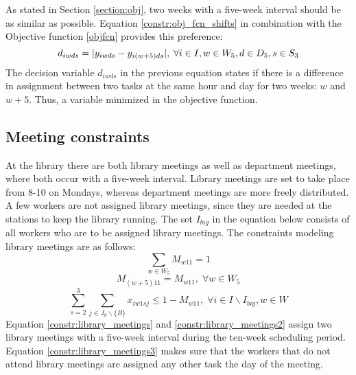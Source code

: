 As stated in Section \ref{section:obj}, two weeks with a five-week interval should be as similar as possible. Equation \ref{constr:obj_fcn_shifts} in combination with the Objective function \ref{objfcn} provides this preference:
\begin{equation} \label{constr:obj_fcn_shifts}
d_{iwds} = \lvert y_{iwds} - y_{i(w+5)ds}\rvert, \; \forall i \in I, w \in W_5, d \in D_5, s \in S_3
\end{equation}
The decision variable $d_{iwds}$ in the previous equation states if there is a difference in assignment between two tasks at the same hour and day for two weeks: $w$ and $w+5$. Thus, a variable minimized in the objective function.
\subsection{Meeting constraints} \label{section:meeting_constraints}
At the library there are both library meetings as well as department meetings, where both occur with a five-week interval. Library meetings are set to take place from 8-10 on Mondays, whereas department meetings are more freely distributed. A few workers are not assigned library meetings, since they are needed at the stations to keep the library running. The set $I_{big}$ in the equation below consists of all workers who are to be assigned library meetings. The constraints modeling library meetings are as follows:
\begin{equation} \label{constr:library_meetings}
\sum_{w \in W_5} M_{w11} = 1
\end{equation}
\begin{equation} \label{constr:library_meetings2}
M_{(w+5)11} = M_{w11}, \; \forall w \in W_5
\end{equation}
\begin{equation} \label{constr:library_meetings3}
\sum_{s=2}^{3} \sum_{j \in J_d \backslash \{B\}} x_{iw1sj} \leq 1-M_{w11}, \; \forall i \in I \backslash I_{big}, w \in W
\end{equation}
Equation \ref{constr:library_meetings} and \ref{constr:library_meetings2} assign two library meetings with a five-week interval during the ten-week scheduling period. Equation \ref{constr:library_meetings3} makes sure that the workers that do not attend library meetings are assigned any other task the day of the meeting.

